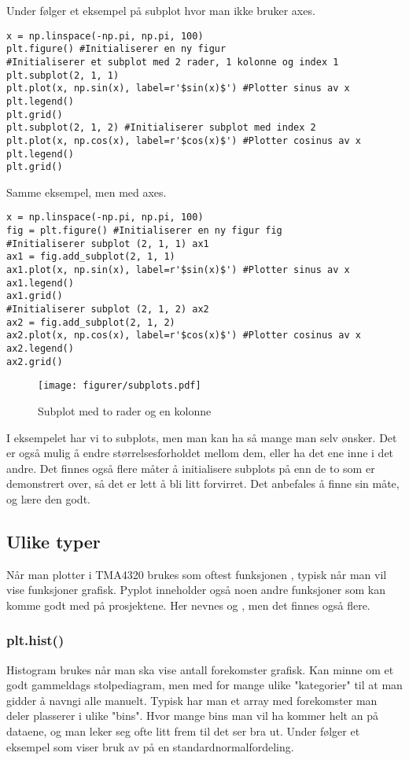 \documentclass[a4paper,12pt]{article}
\begin{document}
Under følger et eksempel på subplot hvor man ikke bruker axes.

\begin{lstlisting}
x = np.linspace(-np.pi, np.pi, 100)
plt.figure() #Initialiserer en ny figur
#Initialiserer et subplot med 2 rader, 1 kolonne og index 1
plt.subplot(2, 1, 1) 
plt.plot(x, np.sin(x), label=r'$sin(x)$') #Plotter sinus av x
plt.legend()
plt.grid()
plt.subplot(2, 1, 2) #Initialiserer subplot med index 2
plt.plot(x, np.cos(x), label=r'$cos(x)$') #Plotter cosinus av x
plt.legend()
plt.grid()
\end{lstlisting}

Samme eksempel, men med axes.

\begin{lstlisting}
x = np.linspace(-np.pi, np.pi, 100)
fig = plt.figure() #Initialiserer en ny figur fig
#Initialiserer subplot (2, 1, 1) ax1
ax1 = fig.add_subplot(2, 1, 1) 
ax1.plot(x, np.sin(x), label=r'$sin(x)$') #Plotter sinus av x
ax1.legend()
ax1.grid()
#Initialiserer subplot (2, 1, 2) ax2
ax2 = fig.add_subplot(2, 1, 2) 
ax2.plot(x, np.cos(x), label=r'$cos(x)$') #Plotter cosinus av x
ax2.legend()
ax2.grid()
\end{lstlisting}

\begin{figure}[ht]
    \centering
    \texttt{[image: figurer/subplots.pdf]}
    \caption{Subplot med to rader og en kolonne}
    \label{fig:subplots.pdf}
\end{figure}

I eksempelet har vi to subplots, men man kan ha så mange man selv ønsker. Det er også mulig å endre størrelsesforholdet mellom dem, eller ha det ene inne i det andre. Det finnes også flere måter å initialisere subplots på enn de to som er demonstrert over, så det er lett å bli litt forvirret. Det anbefales å finne sin måte, og lære den godt.


\subsection{Ulike typer}
Når man plotter i TMA4320 brukes som oftest funksjonen , typisk når man vil vise funksjoner grafisk. Pyplot inneholder også noen andre funksjoner som kan komme godt med på prosjektene. Her nevnes  og , men det finnes også flere.


\subsubsection{plt.hist()}
Histogram brukes når man ska vise antall forekomster grafisk. Kan minne om et godt gammeldags stolpediagram, men med for mange ulike "kategorier" til at man gidder å navngi alle manuelt. Typisk har man et array med forekomster man deler plasserer i ulike "bins". Hvor mange bins man vil ha kommer helt an på dataene, og man leker seg ofte litt frem til det ser bra ut. Under følger et eksempel som viser bruk av  på en standardnormalfordeling.
\end{document}
